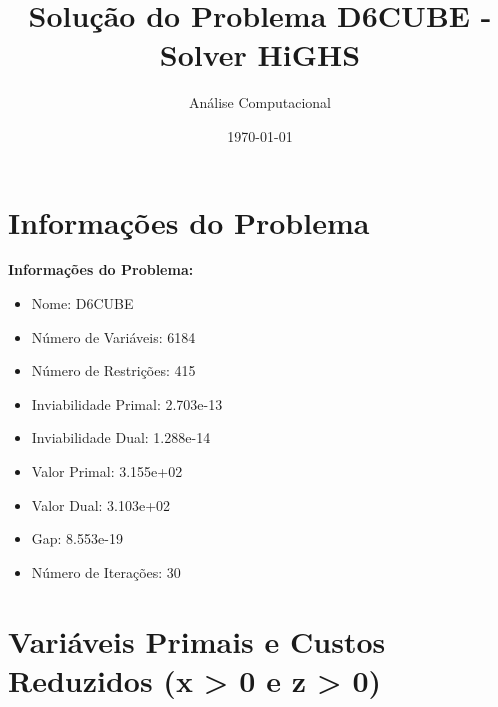 \documentclass[12pt]{article}
\title{Solução do Problema D6CUBE - Solver HiGHS}
\author{Análise Computacional}
\date{\today}
\begin{document}
\maketitle

\section{Informações do Problema}

\textbf{Informações do Problema:}
\begin{itemize}
\item Nome: D6CUBE
\item Número de Variáveis: 6184
\item Número de Restrições: 415
\item Inviabilidade Primal: 2.703e-13
\item Inviabilidade Dual: 1.288e-14
\item Valor Primal: 3.155e+02
\item Valor Dual: 3.103e+02
\item Gap: 8.553e-19
\item Número de Iterações: 30
\end{itemize}


\section{Variáveis Primais e Custos Reduzidos (x > 0 e z > 0)}
\end{document}
